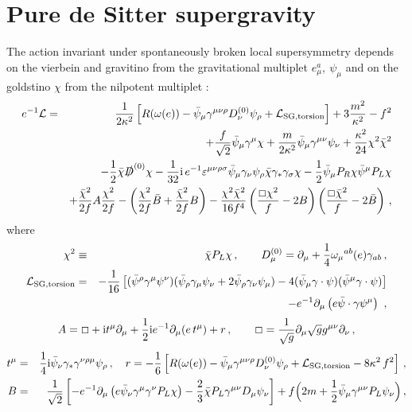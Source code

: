 \documentclass[11pt]{article}
\newcommand{\ft}[2]{{\frac{#1}{#2}}}
\newcommand{\bbox}{\lower.2ex\hbox{$\Box$}}
\def\rmi{{\rm i}}
\begin{document}
\section{Pure de Sitter supergravity }\label{appB}
The action invariant under spontaneously broken local supersymmetry depends on the vierbein and gravitino from the gravitational multiplet $e^a_\mu,~\psi_\mu$ and on the goldstino $\chi$ from the nilpotent multiplet \cite{Bergshoeff:2015tra,Hasegawa:2015bza}: 
\begin{eqnarray}
 e^{-1}{\cal L} & = &\frac{1}{2\kappa^2} \left[ R(\omega (e )) -\bar \psi _\mu \gamma ^{\mu \nu \rho } D^{(0)}_\nu \psi _\rho
 +{\cal L}_{\rm SG,torsion} \right] +3 \frac{m^2}{\kappa^2} - f^2 \nonumber\\
&&+\frac{f}{\sqrt{2}} \bar \psi_\mu \gamma
  ^\mu   \chi+\frac{m}{2\kappa^2}  \bar \psi _{\mu } \gamma ^{\mu \nu }\psi _{\nu } +\frac{\kappa^2}{24} \chi ^2\bar \chi ^2\nonumber\\
 &&-\ft12\bar \chi  \slashed{D}^{(0)}\chi -\ft{1}{32}\rmi\,e^{-1}\varepsilon ^{\mu \nu \rho \sigma }\bar \psi _\mu \gamma _\nu \psi _\rho \bar \chi \gamma _*\gamma _\sigma \chi-\ft12\bar \psi _\mu P_R\chi \bar \psi ^\mu P_L\chi\nonumber\\
&& +\frac{\bar  \chi^2}{2 f}A \frac{\chi^2}{2 f} -\left(\frac{ \chi^2}{2 f} \bar B+\frac{\bar \chi^2}{2 f} B\right) - \frac{\chi^2\bar \chi^2}{16 f^4}\left(\frac{\bbox\chi^2}{f}-2B\right)\left(\frac{\bbox\bar \chi^2}{f}-2\bar B\right)\,,\label{finalactionf1}
\end{eqnarray}
where
\begin{eqnarray}
\chi ^2&\equiv& \bar \chi P_L\chi \,,\qquad   D^{(0)}_\mu    = \partial _\mu +\ft14 \omega _\mu {}^{ab}(e )\gamma _{ab}\,,\nonumber\\
  {\cal L}_{\rm SG,torsion}&=&-\ft{1}{16}\left[
(\bar{\psi}^\rho\gamma^\mu\psi^\nu) ( \bar{\psi}_\rho\gamma_\mu\psi_\nu
+2 \bar{\psi}_\rho\gamma_\nu\psi_\mu) - 4 (\bar{\psi}_\mu
\gamma\cdot\psi)(\bar{\psi}^\mu \gamma\cdot\psi)\right]\nonumber\\
&&-e^{-1}\partial _\mu \left(e\bar \psi \cdot \gamma \psi ^\mu \right)\ ,
\label{covder0}
\end{eqnarray}
\begin{equation}
  A= \bbox + \rmi t^\mu \partial _\mu + \ft12\rmi e^{-1}\partial _\mu (e\,t^\mu) + r\,, \qquad
  \bbox =\frac{1}{\sqrt{g}}\partial _\mu \sqrt{g}g^{\mu\nu}\partial _\nu\,,
 \label{formA}
\end{equation}
\begin{eqnarray}
t^\mu &=&  \ft14 {\rmi} {\bar \psi}_\nu \gamma_* \gamma^{\nu\rho\mu}\psi_\rho\,,\quad
r =-\ft16 \left[R(\omega (e )) -\bar \psi _\mu \gamma ^{\mu \nu \rho } D^{(0)}_\nu \psi _\rho
    + {\cal L}_{\rm SG,torsion}
   -8\kappa ^2\,f^2\right] \,,\nonumber\\
 B  &=& \frac{1}{\sqrt{2}}\left[-e^{-1}\partial _\mu \left(e\bar \psi _\nu \gamma ^\mu \gamma ^\nu P_L  \chi  \right)-\ft23\bar \chi P_L \gamma ^{\mu \nu }D _\mu \psi _\nu  \right]
 + f
\Bigl(2 m +   %
\frac{1}{2} {\bar\psi}_\mu\gamma^{\mu\nu}P_L\psi_\nu\Bigr)\,,\label{formB}
\end{eqnarray}
\end{document}
